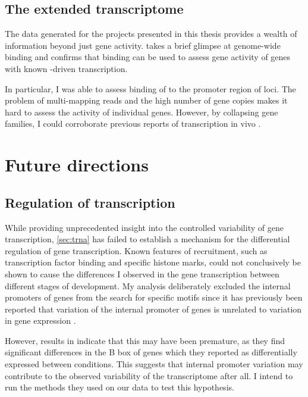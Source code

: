 \subsection{The extended  transcriptome}

The  \chipseq data generated for the projects presented in this thesis
provides a wealth of information beyond just \trna gene activity.
 takes a brief glimpse at genome-wide  binding and confirms
that  binding can be used to assess gene activity of genes with known
-driven transcription.

In particular, I was able to assess binding of  to the promoter region of
\transsine loci. The problem of multi-mapping reads and the high number of
\transsine gene copies makes it hard to assess the activity of individual
\transsine genes. However, by collapsing \transsine gene families, I could
corroborate previous reports of \transsine transcription in vivo
\citep{Carriere:2012}.

\section{Future directions}

\subsection{Regulation of  transcription}

While providing unprecedented insight into the controlled variability of \trna
gene transcription, \cref{sec:trna} has failed to establish a mechanism for the
differential regulation of \trna gene transcription. Known features of 
recruitment, such as transcription factor binding and specific histone marks,
could not conclusively be shown to cause the differences I observed in the \trna
gene transcription between different stages of development. My analysis
deliberately excluded the internal promoters of \trna genes from the search for
specific motifs since it has previously been reported that variation of the
internal promoter of \trna genes is unrelated to variation in gene expression
\citep{Oler:2010,Canella:2012}.

However, results in \citet{Gingold:2014} indicate that this may have been
premature, as they find significant differences in the B box of \trna genes
which they reported as differentially expressed between conditions. This
suggests that internal promoter variation may contribute to the observed
variability of the \trna transcriptome after all. I intend to run the methods
they used on our data to test this hypothesis.

